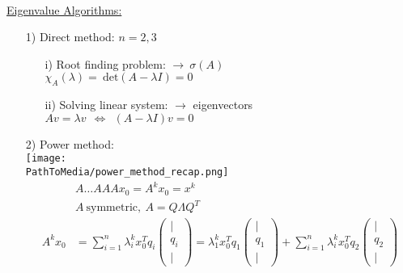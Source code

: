\begin{frame}
~\\
{\blank
\underline{Eigenvalue Algorithms:}
\begin{itemize}\blank
	\item [1)]
	Direct method: $n=2,3$
	\begin{itemize}
		\item [i)]
		Root finding problem: $ \rightarrow~\sigma(A) $\\
		$ \chi_{A}(\lambda)=~\text{det}(A-\lambda I)=0 $
		\item [ii)]
		Solving linear system: $ \rightarrow $ eigenvectors\\
		$ Av=\lambda v~~\Leftrightarrow~~(A-\lambda I)v = 0 $
	\end{itemize}
	\item [2)]
	Power method:\\
	\texttt{[image: \\PathToMedia/power\_method\_recap.png]}
	\begin{align*}
	&A\dots AAAx_0=A^kx_0=x^k\\
	&A~\text{symmetric},~A=Q\Lambda Q^T\\
	A^kx_0&=\sum_{i=1}^n \lambda_i^k x_0^T q_i \begin{pmatrix}
	|\\q_i\\|
	\end{pmatrix}
	=\lambda_1^k x_0^T q_1 \begin{pmatrix}
	|\\q_1\\|
	\end{pmatrix}
	+\sum_{i=1}^n \lambda_i^k x_0^T q_2 \begin{pmatrix}
	|\\q_2\\|
	\end{pmatrix}
	\end{align*}
\end{itemize}
}
\end{frame}

